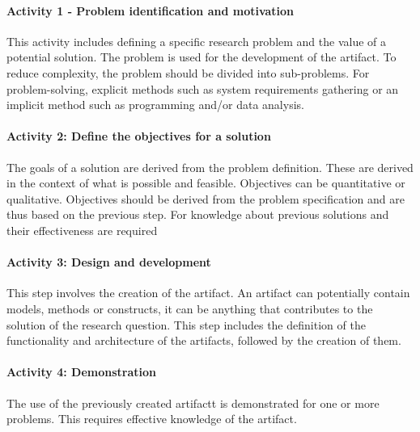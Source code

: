 \paragraph{Activity 1 - Problem identification and motivation} 
This activity includes defining a specific research problem and the value of a potential solution. 
The problem is used for the development of the artifact. To reduce complexity, the problem should be divided into sub-problems. For problem-solving, explicit methods such as system requirements gathering or an implicit method such as programming and/or data analysis. 
\cite[p. 52]{peffers_designscienceresearch_2007}

\paragraph{Activity 2: Define the objectives for a solution} 
The goals of a solution are derived from the problem definition. These are derived in the context of what is possible and feasible.
Objectives can be quantitative or qualitative. Objectives should be derived from the
problem specification and are thus based on the previous step. 
For knowledge about previous solutions and their effectiveness are required 
\cite[p. 55]{peffers_designscienceresearch_2007}

\paragraph{Activity 3: Design and development} 
This step involves the creation of the artifact. An artifact can potentially contain models,
methods or constructs, it can be anything that contributes to the solution of the research question. 
This step includes the definition of the functionality and architecture of the artifacts, followed by the creation of them.
\cite[p. 55]{peffers_designscienceresearch_2007}

\paragraph{Activity 4: Demonstration} 
The use of the previously created artifactt is demonstrated for one or more problems.
This requires effective knowledge of the artifact. 
\cite[p. 55]{peffers_designscienceresearch_2007}

